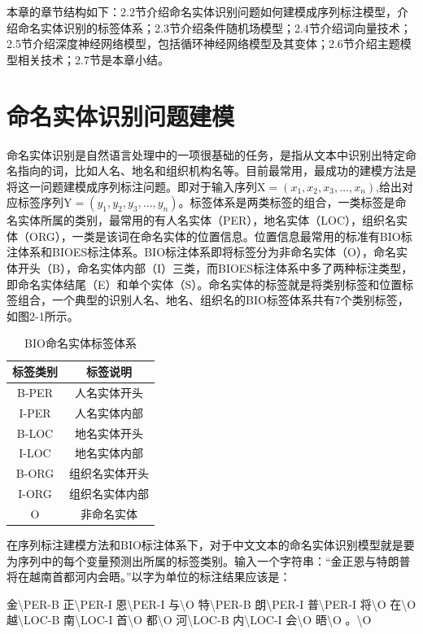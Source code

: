 \documentclass[winfonts,master,oneside,nobackinfo]{njuthesis}
\begin{document}
本章的章节结构如下：2.2节介绍命名实体识别问题如何建模成序列标注模型，介绍命名实体识别的标签体系；2.3节介绍条件随机场模型；2.4节介绍词向量技术；2.5节介绍深度神经网络模型，包括循环神经网络模型及其变体；2.6节介绍主题模型相关技术；2.7节是本章小结。

\section{命名实体识别问题建模}
命名实体识别是自然语言处理中的一项很基础的任务，是指从文本中识别出特定命名指向的词，比如人名、地名和组织机构名等。目前最常用，最成功的建模方法是将这一问题建模成序列标注问题。即对于输入序列$\mathrm { X } = \left( x _ { 1 } , x _ { 2 } , x _ { 3 } , \dots , x _ { n } \right)$,给出对应标签序列$\mathrm { Y } = \left( y _ { 1 } , y _ { 2 } , y _ { 3 } , \dots , y _ { n } \right)$。标签体系是两类标签的组合，一类标签是命名实体所属的类别，最常用的有人名实体（PER），地名实体（LOC），组织名实体（ORG），一类是该词在命名实体的位置信息。位置信息最常用的标准有BIO标注体系和BIOES标注体系。BIO标注体系即将标签分为非命名实体（O），命名实体开头（B），命名实体内部（I）三类，而BIOES标注体系中多了两种标注类型，即命名实体结尾（E）和单个实体（S）。命名实体的标签就是将类别标签和位置标签组合，一个典型的识别人名、地名、组织名的BIO标签体系共有7个类别标签，如图2-1所示。

\begin{table}[h]
\centering
\begin{tabular}{cc} %
\hline 
标签类别&标签说明\\
\hline  
B-PER&人名实体开头\\
I-PER&人名实体内部\\
B-LOC&地名实体开头\\
I-LOC&地名实体内部\\
B-ORG&组织名实体开头\\
I-ORG&组织名实体内部\\
O&非命名实体\\
\hline 
\end{tabular}
\caption{BIO命名实体标签体系}
\end{table}

在序列标注建模方法和BIO标注体系下，对于中文文本的命名实体识别模型就是要为序列中的每个变量预测出所属的标签类别。输入一个字符串：“金正恩与特朗普将在越南首都河内会晤。”以字为单位的标注结果应该是：

金\textbackslash PER-B 正\textbackslash PER-I 恩\textbackslash PER-I 与\textbackslash O 特\textbackslash PER-B 朗\textbackslash PER-I 普\textbackslash PER-I 将\textbackslash O 在\textbackslash O 越\textbackslash LOC-B 南\textbackslash LOC-I 首\textbackslash O 都\textbackslash O 河\textbackslash LOC-B 内\textbackslash LOC-I 会\textbackslash O 晤\textbackslash O 。\textbackslash O
\end{document}
